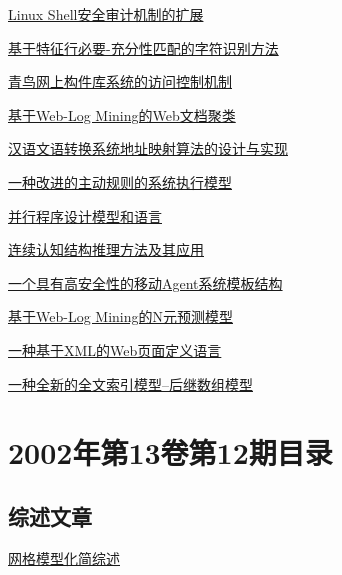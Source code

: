 \documentclass[a4paper]{article}
\begin{document}
\href{http://www.jos.org.cn/ch/reader/download_pdf.aspx?file_no=20020111&year_id=2002&quarter_id=1&falg=1}{Linux Shell安全审计机制的扩展}

\href{http://www.jos.org.cn/ch/reader/download_pdf.aspx?file_no=20020112&year_id=2002&quarter_id=1&falg=1}{基于特征行必要-充分性匹配的字符识别方法}

\href{http://www.jos.org.cn/ch/reader/download_pdf.aspx?file_no=20020113&year_id=2002&quarter_id=1&falg=1}{青鸟网上构件库系统的访问控制机制}

\href{http://www.jos.org.cn/ch/reader/download_pdf.aspx?file_no=20020114&year_id=2002&quarter_id=1&falg=1}{基于Web-Log Mining的Web文档聚类}

\href{http://www.jos.org.cn/ch/reader/download_pdf.aspx?file_no=20020115&year_id=2002&quarter_id=1&falg=1}{汉语文语转换系统地址映射算法的设计与实现}

\href{http://www.jos.org.cn/ch/reader/download_pdf.aspx?file_no=20020116&year_id=2002&quarter_id=1&falg=1}{一种改进的主动规则的系统执行模型}

\href{http://www.jos.org.cn/ch/reader/download_pdf.aspx?file_no=20020117&year_id=2002&quarter_id=1&falg=1}{并行程序设计模型和语言}

\href{http://www.jos.org.cn/ch/reader/download_pdf.aspx?file_no=20020118&year_id=2002&quarter_id=1&falg=1}{连续认知结构推理方法及其应用}

\href{http://www.jos.org.cn/ch/reader/download_pdf.aspx?file_no=20020119&year_id=2002&quarter_id=1&falg=1}{一个具有高安全性的移动Agent系统模板结构}

\href{http://www.jos.org.cn/ch/reader/download_pdf.aspx?file_no=20020120&year_id=2002&quarter_id=1&falg=1}{基于Web-Log Mining的N元预测模型}

\href{http://www.jos.org.cn/ch/reader/download_pdf.aspx?file_no=20020121&year_id=2002&quarter_id=1&falg=1}{一种基于XML的Web页面定义语言}

\href{http://www.jos.org.cn/ch/reader/download_pdf.aspx?file_no=20020122&year_id=2002&quarter_id=1&falg=1}{一种全新的全文索引模型--后继数组模型}


\section{\textbf{2002年第13卷第12期目录}}
\subsection{综述文章}
\href{http://www.jos.org.cn/ch/reader/download_pdf.aspx?file_no=20021201&year_id=2002&quarter_id=12&falg=1}{网格模型化简综述}
\end{document}
